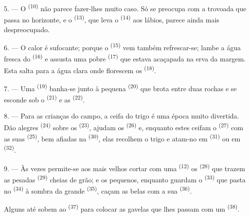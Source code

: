 \VUsaut{5.0mm}
\VUsaut{3.4mm}

5. --- O  \textsuperscript{(10)} não parece fazer-lhes muito caso.
Só se preocupa com a trovoada que passa no horizonte, e o
 \textsuperscript{(13)}, que leva o 
\textsuperscript{(14)} aos lábios, parece ainda mais despreocupado.

6. --- O calor é sufocante; porque o  \textsuperscript{(15)} vem também
refrescar-se; lambe a água fresca do  \textsuperscript{(16)} e
assusta uma pobre  \textsuperscript{(17)} que estava acaçapada na erva
da margem. Esta salta para a água clara onde florescem os
 \textsuperscript{(18)}.

7. --- Uma  \textsuperscript{(19)} banha-se junto à pequena
 \textsuperscript{(20)} que brota entre duas rochas e se esconde
sob o  \textsuperscript{(21)} e as  \textsuperscript{(22)}.

\VUsaut{5.0mm}
\VUsaut{3.4mm}

8. --- Para as crianças do campo, a ceifa do trigo é uma época muito
divertida. Dão alegres  \textsuperscript{(24)} sobre os
 \textsuperscript{(23)}, ajudam os 
\textsuperscript{(26)} e, enquanto estes ceifam o 
\textsuperscript{(27)} com as suas  \textsuperscript{(25)}, bem afiadas
na  \textsuperscript{(30)}, elas recolhem o trigo e
atam-no em  \textsuperscript{(31)} ou em 
\textsuperscript{(32)}.

9. --- Às vezes permite-se aos mais velhos cortar com uma 
\textsuperscript{(12)} os  \textsuperscript{(28)} que trazem as
pesadas  \textsuperscript{(29)} cheias de grão; e os pequenos,
enquanto guardam o  \textsuperscript{(33)} que pasta no 
\textsuperscript{(34)} à sombra da grande  \textsuperscript{(35)}, caçam as
belas  com a sua  \textsuperscript{(36)}.

Alguns até sobem ao  \textsuperscript{(37)} para colocar as gavelas
que lhes passam com um  \textsuperscript{(38)}.

